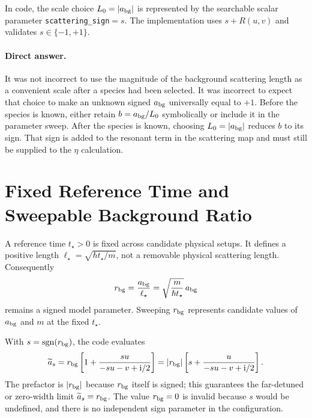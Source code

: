 \documentclass[9pt,a4paper,twocolumn,twoside]{rho-class/rho}
\newcommand{\ii}{\mathrm{i}}
\begin{document}
        In code, the scale choice $L_0=|a_{\rm bg}|$ is represented by the
        searchable scalar parameter \texttt{scattering\_sign}$=s$.  The
        implementation uses $s+R(u,v)$ and validates $s\in\{-1,+1\}$.

    \paragraph{Direct answer.}
        It was not incorrect to use the magnitude of the background scattering
        length as a convenient scale after a species had been selected.  It was
        incorrect to expect that choice to make an unknown signed
        $a_{\rm bg}$ universally equal to $+1$.  Before the species is known,
        either retain $b=a_{\rm bg}/L_0$ symbolically or include it in the
        parameter sweep.  After the species is known, choosing
        $L_0=|a_{\rm bg}|$ reduces $b$ to its sign.  That sign is added to the
        resonant term in the scattering map and must still be supplied to the
        $\eta$ calculation.

\fi

\section{Fixed Reference Time and Sweepable Background Ratio}
\label{app:fixed-reference-time}

    A reference time $t_\star>0$ is fixed across candidate physical setups.
    It defines a positive length $\ell_\star=\sqrt{\hbar t_\star/m}$, not a
    removable physical scattering length. Consequently
    \begin{equation}
        r_{\rm bg}=\frac{a_{\rm bg}}{\ell_\star}
        =\sqrt{\frac{m}{\hbar t_\star}}\,a_{\rm bg}
    \end{equation}
    remains a signed model parameter. Sweeping $r_{\rm bg}$ represents
    candidate values of $a_{\rm bg}$ and $m$ at the fixed $t_\star$.

    With $s=\operatorname{sgn}(r_{\rm bg})$, the code evaluates
    \begin{equation}
        \widetilde a_s
        =r_{\rm bg}\left[1+\frac{s u}{-s u-v+\ii/2}\right]
        =|r_{\rm bg}|\left[s+\frac{u}{-s u-v+\ii/2}\right].
    \end{equation}
    The prefactor is $|r_{\rm bg}|$ because $r_{\rm bg}$ itself is signed;
    this guarantees the far-detuned or zero-width limit
    $\widetilde a_s=r_{\rm bg}$. The value $r_{\rm bg}=0$ is invalid because
    $s$ would be undefined, and there is no independent sign parameter in the
    configuration.
\end{document}
